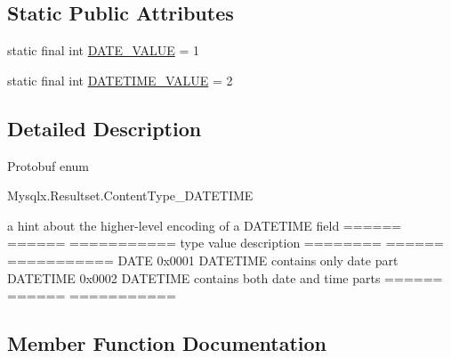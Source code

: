 \subsection*{Static Public Attributes}
\begin{DoxyCompactItemize}
\item 
static final int \mbox{\hyperlink{enumcom_1_1mysql_1_1cj_1_1x_1_1protobuf_1_1_mysqlx_resultset_1_1_content_type___d_a_t_e_t_i_m_e_acf12c221884a0c0248aec490d30d301c}{D\+A\+T\+E\+\_\+\+V\+A\+L\+UE}} = 1
\item 
static final int \mbox{\hyperlink{enumcom_1_1mysql_1_1cj_1_1x_1_1protobuf_1_1_mysqlx_resultset_1_1_content_type___d_a_t_e_t_i_m_e_a70488fdeb74561265df622ee9e4e1910}{D\+A\+T\+E\+T\+I\+M\+E\+\_\+\+V\+A\+L\+UE}} = 2
\end{DoxyCompactItemize}


\subsection{Detailed Description}
Protobuf enum
\begin{DoxyCode}
Mysqlx.Resultset.ContentType\_DATETIME 
\end{DoxyCode}



\begin{DoxyPre}
a hint about the higher-level encoding of a DATETIME field
======   ====== ===========
type     value  description
======== ====== ===========
DATE     0x0001 DATETIME contains only date part
DATETIME 0x0002 DATETIME contains both date and time parts
======   ====== ===========
\end{DoxyPre}
 

\subsection{Member Function Documentation}
\mbox{\label{enumcom_1_1mysql_1_1cj_1_1x_1_1protobuf_1_1_mysqlx_resultset_1_1_content_type___d_a_t_e_t_i_m_e_ae7f5888be5a77359eed504dbcb75bbc9}} 
